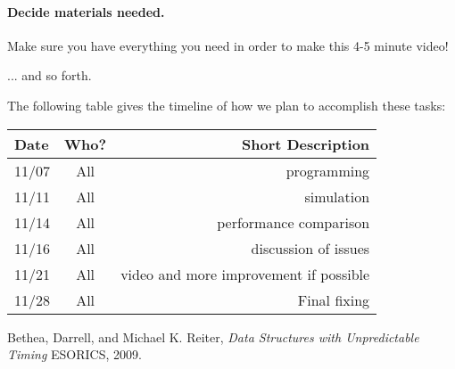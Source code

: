 \documentclass[11pt,twocolumn]{article}
\begin{document}
\paragraph{Decide materials needed.}  Make sure you have everything you need in 
order to make this 4-5 minute video!

... and so forth.

The following table gives the timeline of how we plan to accomplish these tasks:

\begin{table}[h!]
\centering
\begin{tabular}{ |l | c | r|}
  \hline
  Date & Who? & Short Description \\
  \hline
  \hline
  11/07 & All & programming \\
  \hline
  11/11 & All & simulation \\
  
  \hline
  11/14 & All & performance comparison \\
  
  \hline
  11/16 & All & discussion of issues \\
  
  \hline
  11/21 & All & video and more improvement if possible \\
  
 
  \hline
  11/28 & All & Final fixing \\
  \hline
\end{tabular}
\end{table}

\pagebreak

\begin{thebibliography}{9}
	
	Bethea, Darrell, and Michael K. Reiter,
	\emph{Data Structures with Unpredictable Timing}
	ESORICS,
	2009.
	
\end{thebibliography}
\end{document}
